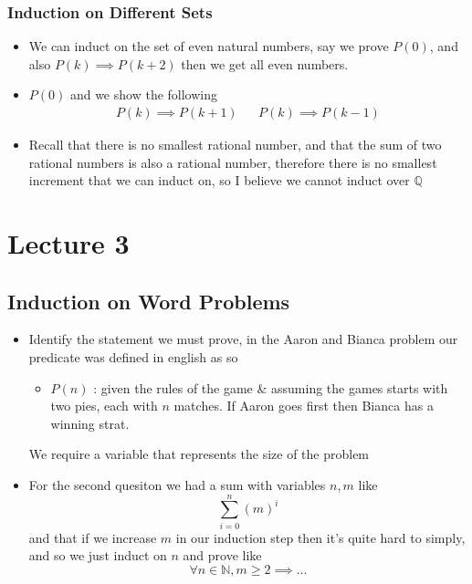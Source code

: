 \documentclass[11pt]{book}
\begin{document}
\subsection{Induction on Different Sets}%
\label{sub:induction_on_different_sets}

\begin{itemize}
    \item We can induct on the set of even natural numbers, say we prove $P\left(0\right) $,  and also $P\left(k\right) \implies P\left(k + 2\right) $ then we get all even numbers.
    \item $P\left(0\right) $ and we show the following 
        \begin{align*}
            P\left(k\right) \implies P\left(k + 1\right)  && P\left(k\right) \implies P\left(k - 1\right) 
        \end{align*}
    \item Recall that there is no smallest rational number, and that the sum of two rational numbers is also a rational number, therefore there is no smallest increment that we can induct on, so I believe we cannot induct over $\mathbb{Q} $ 
\end{itemize}



\chapter{Lecture 3}%
\label{chp:lecture_3}

\section{Induction on Word Problems}%
\label{sec:induction_on_word_problems}

\begin{itemize}
    \item Identify the statement we must prove, in the Aaron and Bianca problem our predicate was defined in english as so
        \begin{itemize}
            \item $P\left(n\right) $ : given the rules of the game \& assuming the games starts with two pies, each with $n$ matches. If Aaron goes first then Bianca has a winning strat.
        \end{itemize}
        \begin{note}
            We require a variable that represents the size of the problem
        \end{note}
    \item For the second quesiton we had a sum with variables $n, m$ like
        \[
            \sum_{i=0}^{n} \left( m \right)^{i}   
        \]
        and that if we increase $m$ in our induction step then it's quite hard to simply, and so we just induct on $n$ and prove like
        \[
            \forall n \in \mathbb{N}, m \ge 2 \implies \ldots 
        \]
\end{itemize}
\end{document}

